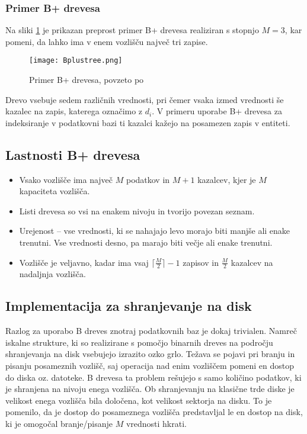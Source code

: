 \documentclass[a4paper,12pt,openright]{book}
\begin{document}
        \subsubsection{Primer B+ drevesa}
        Na sliki \ref{btree_example} je prikazan preprost primer B+ drevesa realiziran s stopnjo $M=3$, kar pomeni, da lahko ima v enem vozlišču največ tri zapise.
        
        \begin{figure}[H]        
            \centerline{\texttt{[image: Bplustree.png]}}
            \caption{Primer B+ drevesa, povzeto po \cite{BPTREE}}
            \label{btree_example}
        \end{figure}

        \noindent
        Drevo vsebuje sedem različnih vrednosti, pri čemer vsaka izmed vrednosti še kazalec na zapis, katerega označimo z $d_i$. V primeru uporabe B+ drevesa za indeksiranje v podatkovni bazi ti kazalci kažejo na posamezen zapis v entiteti.
        
        \subsection{Lastnosti B+ drevesa}
        \begin{itemize}
            \item Vsako vozlišče ima največ $M$ podatkov in $M+1$ kazalcev, kjer je $M$ kapaciteta vozlišča.
            \item Listi drevesa so vsi na enakem nivoju in tvorijo povezan seznam.
            \item Urejenost – vse vrednosti, ki se nahajajo levo morajo biti manjše ali enake trenutni. Vse vrednosti desno, pa marajo biti večje ali enake trenutni.
            \item Vozlišče je veljavno, kadar ima vsaj $\lceil \frac{M}{2}\rceil - 1$ zapisov in $\frac{M}{2}$ kazalcev na nadaljnja vozlišča.
        \end{itemize}

        \subsection{Implementacija za shranjevanje na disk}
        Razlog za uporabo B dreves znotraj podatkovnih baz je dokaj trivialen. Namreč iskalne strukture, ki so realizirane s pomočjo binarnih dreves na področju shranjevanja na disk vsebujejo izrazito ozko grlo. Težava se pojavi pri branju in pisanju posameznih vozlišč, saj operacija nad enim vozliščem pomeni en dostop do diska oz. datoteke. B drevesa ta problem rešujejo s samo količino podatkov, ki je shranjena na nivoju enega vozlišča. Ob shranjevanju na klasične trde diske je velikost enega vozlišča bila določena, kot velikost sektorja na disku. To je pomenilo, da je dostop do posameznega vozlišča predstavljal le en dostop na disk, ki je omogočal branje/pisanje $M$ vrednosti hkrati.
\end{document}
